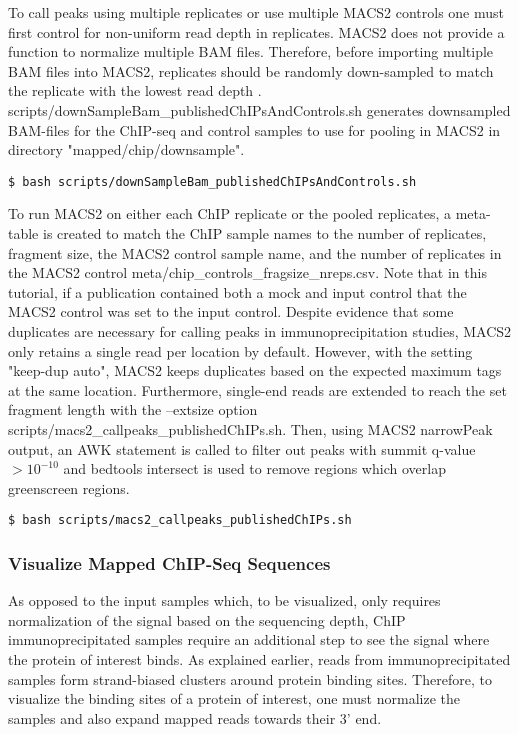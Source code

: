 \documentclass{article}
\begin{document}
\begin{sloppypar}
To call peaks using multiple replicates or use multiple MACS2 controls one must first control for non-uniform read depth in replicates. MACS2 does not provide a function to normalize multiple BAM files. Therefore, before importing multiple BAM files into MACS2, replicates should be randomly down-sampled to match the replicate with the lowest read depth \cite{downsamp}. {\selectfont scripts/downSampleBam\_publishedChIPsAndControls.sh} generates downsampled BAM-files for the ChIP-seq and control samples to use for pooling in MACS2  in directory "mapped/chip/downsample".

\begin{verbatim}
$ bash scripts/downSampleBam_publishedChIPsAndControls.sh
\end{verbatim}

To run MACS2 on either each ChIP replicate or the pooled replicates, a meta-table is created to match the ChIP sample names to the number of replicates, fragment size, the MACS2 control sample name, and the number of replicates in the MACS2 control {\selectfont meta/chip\_controls\_fragsize\_nreps.csv}. Note that in this tutorial, if a publication contained both a mock and input control that the MACS2 control was set to the input control. Despite evidence that some duplicates are necessary for calling peaks in immunoprecipitation studies, MACS2 only retains a single read per location by default. However, with the setting "keep-dup auto", MACS2 keeps duplicates based on the expected maximum tags at the same location. Furthermore, single-end reads are extended to reach the set fragment length with the --extsize option {\selectfont scripts/macs2\_callpeaks\_publishedChIPs.sh}. Then, using MACS2 narrowPeak output, an AWK statement is called to filter out peaks with summit q-value $>10^{-10}$ and bedtools intersect is used to remove regions which overlap greenscreen regions.

\begin{verbatim}
$ bash scripts/macs2_callpeaks_publishedChIPs.sh
\end{verbatim}


\subsubsection{Visualize Mapped ChIP-Seq Sequences}
As opposed to the input samples which, to be visualized, only requires normalization of the signal based on the sequencing depth, ChIP immunoprecipitated samples require an additional step to see the signal where the protein of interest binds. As explained earlier, reads from immunoprecipitated samples form strand-biased clusters around protein binding sites. Therefore, to visualize the binding sites of a protein of interest, one must normalize the samples and also expand mapped reads towards their 3' end.


\end{sloppypar}
\end{document}

